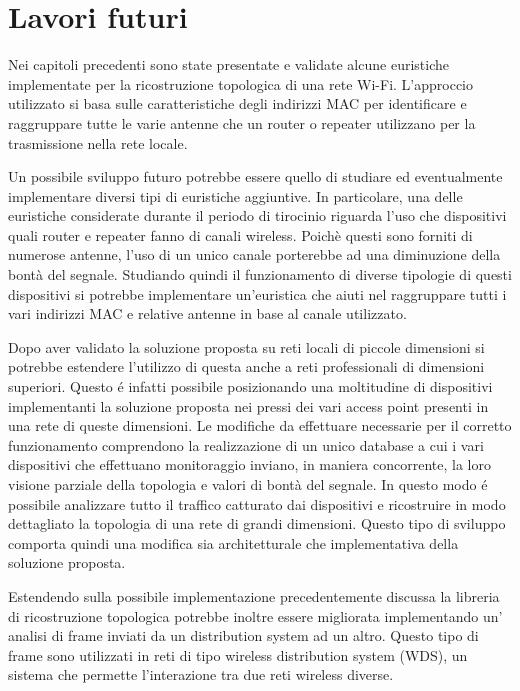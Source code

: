 \chapter{Lavori futuri}

Nei capitoli precedenti sono state presentate e validate alcune euristiche implementate per la ricostruzione topologica di una rete Wi-Fi.
L'approccio utilizzato si basa sulle caratteristiche degli indirizzi MAC per identificare e raggruppare tutte le varie antenne che un router o repeater utilizzano per la trasmissione nella rete locale.

Un possibile sviluppo futuro potrebbe essere quello di studiare ed eventualmente implementare diversi tipi di euristiche aggiuntive.
In particolare, una delle euristiche considerate durante il periodo di tirocinio riguarda l'uso che dispositivi quali router e repeater fanno di canali wireless.
Poich\`e questi sono forniti di numerose antenne, l'uso di un unico canale porterebbe ad una diminuzione della bont\`a del segnale.
Studiando quindi il funzionamento di diverse tipologie di questi dispositivi si potrebbe implementare un'euristica che aiuti nel raggruppare tutti i vari indirizzi MAC e relative antenne in base al canale utilizzato.

Dopo aver validato la soluzione proposta su reti locali di piccole dimensioni si potrebbe estendere l'utilizzo di questa anche a reti professionali di dimensioni superiori.
Questo \'e infatti possibile posizionando una moltitudine di dispositivi implementanti la soluzione proposta nei pressi dei vari access point presenti in una rete di queste dimensioni.
Le modifiche da effettuare necessarie per il corretto funzionamento comprendono la realizzazione di un unico database a cui i vari dispositivi che effettuano monitoraggio  inviano, in maniera concorrente, la loro visione parziale della topologia e valori di bont\`a del segnale.
In questo modo \'e possibile analizzare tutto il traffico catturato dai dispositivi e ricostruire in modo dettagliato la topologia di una rete di grandi dimensioni.
Questo tipo di sviluppo comporta quindi una modifica sia architetturale che implementativa della soluzione proposta.

Estendendo sulla possibile implementazione precedentemente discussa la libreria di ricostruzione topologica potrebbe inoltre essere migliorata implementando un' analisi di frame inviati da un distribution system ad un altro.
Questo tipo di frame sono utilizzati in reti di tipo wireless distribution system (WDS), un sistema che permette l'interazione tra due reti wireless diverse.

